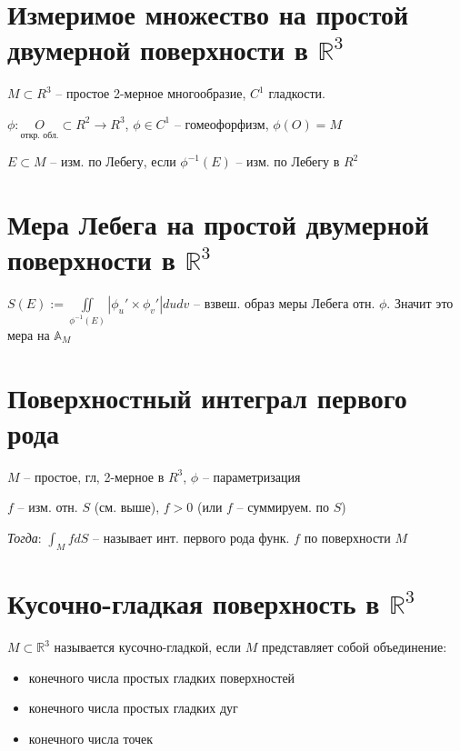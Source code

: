 \documentclass[paper=a4, fontsize=17pt]{article}
\begin{document}
	\section{Измеримое множество на простой двумерной поверхности в $\mathds{R}^3$}
	
	$ M \subset R^3 $ -- простое 2-мерное многообразие, $ C^1 $ гладкости.

	$ \phi : \underset{\text{откр. обл.}}{O} \subset R^2 \rightarrow R^3$, $ \phi \in C^1 $ -- гомеофорфизм, $ \phi(O) = M $

	$ E \subset M $ -- изм. по Лебегу, если $ \phi^{-1}(E) $ -- изм. по Лебегу в $ R^2 $
	
	\section{Мера Лебега на простой двумерной поверхности в $\mathds{R}^3$}

	$ S(E) := \iint\limits_{\phi^{-1}(E)} | \phi_u' \times \phi_v'| dudv $ -- взвеш. образ меры Лебега отн. $ \phi $. Значит это мера на $ \mathbb{A}_{M} $

	\section{Поверхностный интеграл первого рода}
        
        $ M $ -- простое, гл, 2-мерное в $ R^3 $, $ \phi $ -- параметризация

	$ f $ -- изм. отн. $S$ (см. выше), $ f > 0 $ (или $ f $ -- суммируем. по $ S $)

        \emph{Тогда}: $ \int_M f dS$ -- называет инт. первого рода функ. $ f $ по поверхности $M$

	\section{Кусочно-гладкая поверхность в $\mathds{R}^3$}
	
        $M \subset \mathbb R^3$ называется кусочно-гладкой, если $M$ представляет собой объединение:

    \begin{itemize}
	    \item конечного числа простых гладких поверхностей
	    \item конечного числа простых гладких дуг
	    \item конечного числа точек
    \end{itemize}
\end{document}
